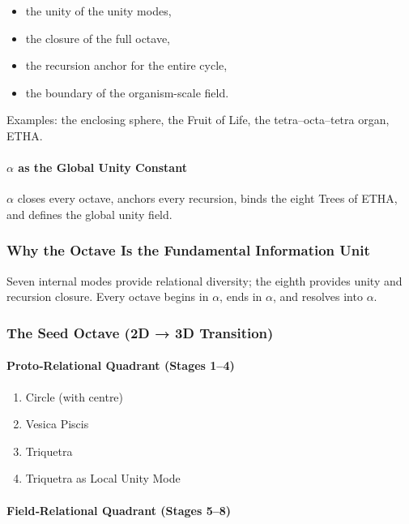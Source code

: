 \begin{itemize}
    \item the unity of the unity modes,
    \item the closure of the full octave,
    \item the recursion anchor for the entire cycle,
    \item the boundary of the organism-scale field.
\end{itemize}

Examples: the enclosing sphere, the Fruit of Life, the tetra–octa–tetra organ, ETHA.

\paragraph{$\alpha$ as the Global Unity Constant}

$\alpha$ closes every octave, anchors every recursion, binds the eight Trees of ETHA, and defines the global unity field.

\subsubsection{Why the Octave Is the Fundamental Information Unit}

Seven internal modes provide relational diversity; the eighth provides unity and recursion closure.  
Every octave begins in $\alpha$, ends in $\alpha$, and resolves into $\alpha$.

\subsubsection{The Seed Octave (2D → 3D Transition)}

\paragraph{Proto‑Relational Quadrant (Stages 1–4)}

\begin{enumerate}
    \item Circle (with centre)
    \item Vesica Piscis
    \item Triquetra
    \item Triquetra as Local Unity Mode
\end{enumerate}

\paragraph{Field‑Relational Quadrant (Stages 5–8)}

